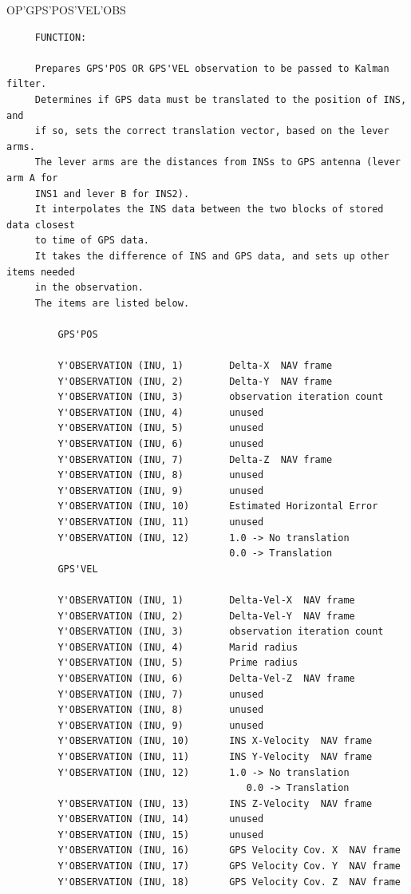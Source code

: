 \begin{frame}
OP'GPS'POS'VEL'OBS
\begin{verbatim}
     FUNCTION: 

     Prepares GPS'POS OR GPS'VEL observation to be passed to Kalman filter.  
     Determines if GPS data must be translated to the position of INS, and 
     if so, sets the correct translation vector, based on the lever arms.  
     The lever arms are the distances from INSs to GPS antenna (lever arm A for 
     INS1 and lever B for INS2).  
     It interpolates the INS data between the two blocks of stored data closest 
     to time of GPS data.   
     It takes the difference of INS and GPS data, and sets up other items needed
     in the observation.
     The items are listed below.

         GPS'POS

         Y'OBSERVATION (INU, 1)        Delta-X  NAV frame
         Y'OBSERVATION (INU, 2)        Delta-Y  NAV frame
         Y'OBSERVATION (INU, 3)        observation iteration count
         Y'OBSERVATION (INU, 4)        unused
         Y'OBSERVATION (INU, 5)        unused
         Y'OBSERVATION (INU, 6)        unused
         Y'OBSERVATION (INU, 7)        Delta-Z  NAV frame
         Y'OBSERVATION (INU, 8)        unused
         Y'OBSERVATION (INU, 9)        unused
         Y'OBSERVATION (INU, 10)       Estimated Horizontal Error
         Y'OBSERVATION (INU, 11)       unused
         Y'OBSERVATION (INU, 12)       1.0 -> No translation
                                       0.0 -> Translation
         GPS'VEL

         Y'OBSERVATION (INU, 1)        Delta-Vel-X  NAV frame
         Y'OBSERVATION (INU, 2)        Delta-Vel-Y  NAV frame
         Y'OBSERVATION (INU, 3)        observation iteration count
         Y'OBSERVATION (INU, 4)        Marid radius
         Y'OBSERVATION (INU, 5)        Prime radius
         Y'OBSERVATION (INU, 6)        Delta-Vel-Z  NAV frame
         Y'OBSERVATION (INU, 7)        unused
         Y'OBSERVATION (INU, 8)        unused
         Y'OBSERVATION (INU, 9)        unused
         Y'OBSERVATION (INU, 10)       INS X-Velocity  NAV frame
         Y'OBSERVATION (INU, 11)       INS Y-Velocity  NAV frame
         Y'OBSERVATION (INU, 12)       1.0 -> No translation
                                          0.0 -> Translation
         Y'OBSERVATION (INU, 13)       INS Z-Velocity  NAV frame
         Y'OBSERVATION (INU, 14)       unused
         Y'OBSERVATION (INU, 15)       unused
         Y'OBSERVATION (INU, 16)       GPS Velocity Cov. X  NAV frame
         Y'OBSERVATION (INU, 17)       GPS Velocity Cov. Y  NAV frame
         Y'OBSERVATION (INU, 18)       GPS Velocity Cov. Z  NAV frame

\end{verbatim}
\end{frame}
